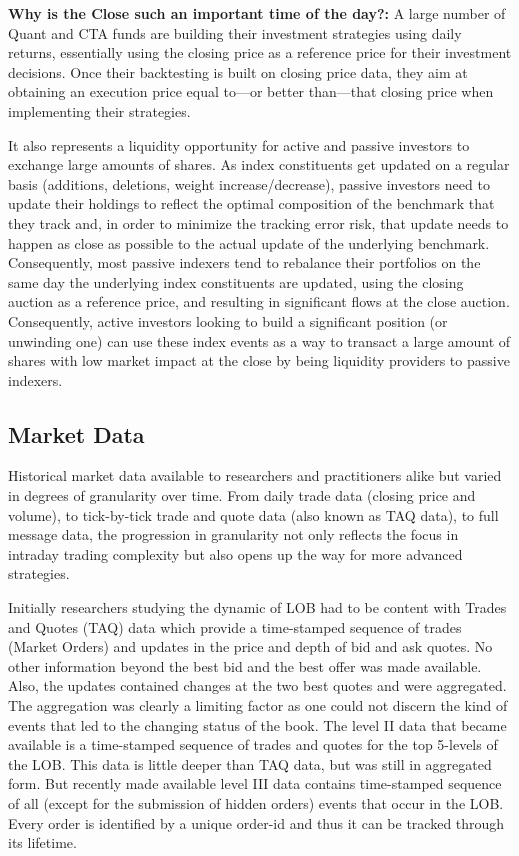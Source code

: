 \noindent\textbf{Why is the Close such an important time of the day?:} A large number of Quant and CTA funds are building their investment strategies using daily returns, essentially using the closing price as a reference price for their investment decisions. Once their backtesting is built on closing price data, they aim at obtaining an execution price equal to---or better than---that closing price when implementing their strategies. 


It also represents a liquidity opportunity for active and passive investors to exchange large amounts of shares. As index constituents get updated on a regular basis (additions, deletions, weight increase/decrease), passive investors need to update their holdings to reflect the optimal composition of the benchmark that they track and, in order to minimize the tracking error risk, that update needs to happen as close as possible to the actual update of the underlying benchmark. Consequently, most passive indexers tend to rebalance their portfolios on the same day the underlying index constituents are updated, using the closing auction as a reference price, and resulting in significant flows at the close auction. Consequently, active investors looking to build a significant position (or unwinding one) can use these index events as a way to transact a large amount of shares with low market impact at the close by being liquidity providers to passive indexers.  



\subsection{Market Data}


Historical market data available to researchers and practitioners alike but varied in degrees of granularity over time. From daily trade data (closing price and volume), to tick-by-tick trade and quote data (also known as TAQ data), to full message data, the progression in granularity not only reflects the focus in intraday trading complexity but also opens up the way for more advanced strategies. 


Initially researchers studying the dynamic of LOB had to be content with Trades and Quotes (TAQ) data which provide a time-stamped sequence of trades (Market Orders) and updates in the price and depth of bid and ask quotes. No other information beyond the best bid and the best offer was made available. Also, the updates contained changes at the two best quotes and were aggregated. The aggregation was clearly a limiting factor as one could not discern the kind of events that led to the changing status of the book. The level II data that became available is a time-stamped sequence of trades and quotes for the top 5-levels of the LOB. This data is little deeper than TAQ data, but was still in aggregated form. But recently made available level III data contains time-stamped sequence of all (except for the submission of hidden orders) events that occur in the LOB. Every order is identified by a unique order-id and thus it can be tracked through its lifetime. \\


